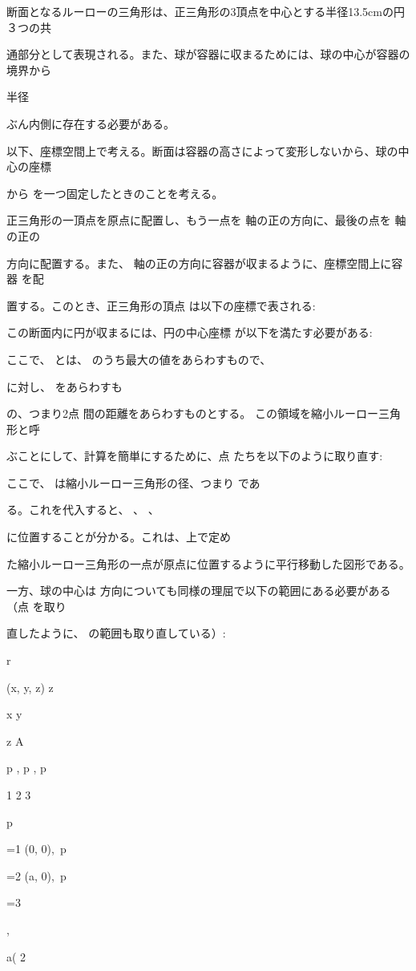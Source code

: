断⾯となるルーローの三⾓形は、正三⾓形の3頂点を中⼼とする半径13.5cmの円３つの共\par
通部分として表現される。また、球が容器に収まるためには、球の中⼼が容器の境界から\par
半径\par
ぶん内側に存在する必要がある。\par
以下、座標空間上で考える。断⾯は容器の⾼さによって変形しないから、球の中⼼の座標\par
から を⼀つ固定したときのことを考える。\par
正三⾓形の⼀頂点を原点に配置し、もう⼀点を 軸の正の⽅向に、最後の点を 軸の正の\par
⽅向に配置する。また、 軸の正の⽅向に容器が収まるように、座標空間上に容器 を配\par
置する。このとき、正三⾓形の頂点 は以下の座標で表される:\par
この断⾯内に円が収まるには、円の中⼼座標 が以下を満たす必要がある:\par
ここで、  とは、 のうち最⼤の値をあらわすもので、\par
に対し、 をあらわすも\par
の、つまり2点 間の距離をあらわすものとする。 この領域を縮⼩ルーロー三⾓形と呼\par
ぶことにして、計算を簡単にするために、点 たちを以下のように取り直す:\par
ここで、 は縮⼩ルーロー三⾓形の径、つまり であ\par
る。これを代⼊すると、 、 、\par
に位置することが分かる。これは、上で定め\par
た縮⼩ルーロー三⾓形の⼀点が原点に位置するように平⾏移動した図形である。\par
⼀⽅、球の中⼼は ⽅向についても同様の理屈で以下の範囲にある必要がある（点 を取り\par
直したように、 の範囲も取り直している）:\par
r\par
(x, y, z) z\par
x y\par
z A\par
p  , p  , p\par
1 2 3\par
p\par
=1 (0, 0), p\par
=2 (a, 0), p\par
=3\par
,\par
a( 2\par
